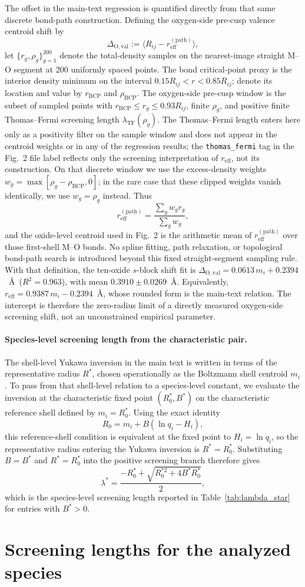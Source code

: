 \documentclass[aps,prl,twocolumn,10pt,superscriptaddress,floatfix]{revtex4-2}
\begin{document}
The offset in the main-text regression is quantified directly from that same
discrete bond-path construction.  Defining the oxygen-side pre-cusp valence centroid
shift by
\[
\Delta_{\mathrm{O,val}}:=\langle R_{ij}-r_{\mathrm{eff}}^{(\mathrm{path})}\rangle,
\]
let $\{r_g,\rho_g\}_{g=1}^{200}$ denote the total-density samples on the
nearest-image straight M--O segment at 200 uniformly spaced points.  The
bond critical-point proxy is the interior density minimum on the interval
$0.15R_{ij}<r<0.85R_{ij}$; denote its location and value by
$r_{\mathrm{BCP}}$ and $\rho_{\mathrm{BCP}}$.  The oxygen-side pre-cusp
window is the subset of sampled points with
$r_{\mathrm{BCP}}\le r_g\le 0.93R_{ij}$, finite $\rho_g$, and positive
finite Thomas--Fermi screening length $\lambda_{\mathrm{TF}}(\rho_g)$.
The Thomas--Fermi length enters here only as a positivity filter on the
sample window and does not appear in the centroid weights or in any of
the regression results; the \texttt{thomas\_fermi} tag in the
Fig.~2 file label reflects only the screening interpretation of
$r_{\mathrm{eff}}$, not its construction.
On that discrete window we use the excess-density weights
$w_g=\max[\rho_g-\rho_{\mathrm{BCP}},0]$; in the rare case that these
clipped weights vanish identically, we use $w_g=\rho_g$ instead.  Thus
\[
r_{\mathrm{eff}}^{(\mathrm{path})}=
\frac{\sum_g w_g r_g}{\sum_g w_g},
\]
and the oxide-level centroid used in Fig.~2 is the arithmetic mean of
$r_{\mathrm{eff}}^{(\mathrm{path})}$ over those first-shell M--O bonds.
No spline fitting, path relaxation, or topological bond-path search is
introduced beyond this fixed straight-segment sampling rule.  With that
definition, the ten-oxide $s$-block shift fit is
$\Delta_{\mathrm{O,val}} = 0.0613\,m_i + 0.2394$~\AA\
($R^2=0.963$), with mean $0.3910\pm0.0269$~\AA.  Equivalently,
$r_{\mathrm{eff}}=0.9387\,m_i-0.2394$~\AA, whose rounded form is the
main-text relation.  The intercept is therefore the zero-radius limit of
a directly measured oxygen-side screening shift, not an unconstrained
empirical parameter.

\paragraph*{Species-level screening length from the characteristic pair.}
The shell-level Yukawa inversion in the main text is written in terms of the
representative radius $R^*$, chosen operationally as the Boltzmann shell
centroid $m_i$.  To pass from that shell-level relation to a species-level
constant, we evaluate the inversion at the characteristic fixed point
$(R_0^*,B^*)$ on the characteristic reference shell defined by $m_i=R_0^*$.
Using the exact identity
\[
R_0 = m_i + B(\ln q_i - H_i),
\]
this reference-shell condition is equivalent at the fixed point to
$H_i=\ln q_i$, so the representative radius entering the Yukawa inversion is
$R^*=R_0^*$.  Substituting $B=B^*$ and $R^*=R_0^*$ into the positive screening
branch therefore gives
\[
\lambda^*=\frac{-R_0^*+\sqrt{R_0^{*2}+4B^*R_0^*}}{2},
\]
which is the species-level screening length reported in
Table~\ref{tab:lambda_star} for entries with $B^*>0$.

\section{Screening lengths for the analyzed species}




\end{document}
